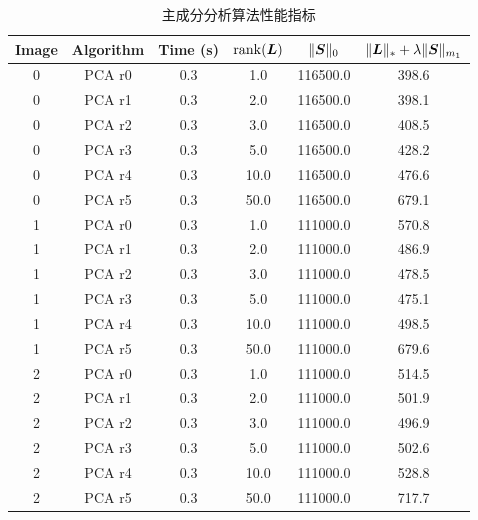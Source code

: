 \documentclass[12pt]{article}
\begin{document}
\begin{table}[!htbp]
  \centering
  \small
  \caption{主成分分析算法性能指标}
  \label{tab:pca_index}
  \begin{tabular}{cccccc}
    \toprule
    Image & Algorithm     & Time (s)  & $\operatorname{rank}(\bm{L})$ & $\|\bm{S}\|_0$  & $\|\bm{L}\|_{*}+\lambda\|\bm{S}\|_{m_1}$ \\
    \midrule
    0     & PCA r0    & 0.3      & 1.0         & 116500.0    & 398.6         \\
    0     & PCA r1    & 0.3      & 2.0         & 116500.0    & 398.1         \\
    0     & PCA r2    & 0.3      & 3.0         & 116500.0    & 408.5         \\
    0     & PCA r3    & 0.3      & 5.0         & 116500.0    & 428.2         \\
    0     & PCA r4    & 0.3      & 10.0        & 116500.0    & 476.6         \\
    0     & PCA r5    & 0.3      & 50.0        & 116500.0    & 679.1         \\
    1     & PCA r0    & 0.3      & 1.0         & 111000.0    & 570.8         \\
    1     & PCA r1    & 0.3      & 2.0         & 111000.0    & 486.9         \\
    1     & PCA r2    & 0.3      & 3.0         & 111000.0    & 478.5         \\
    1     & PCA r3    & 0.3      & 5.0         & 111000.0    & 475.1         \\
    1     & PCA r4    & 0.3      & 10.0        & 111000.0    & 498.5         \\
    1     & PCA r5    & 0.3      & 50.0        & 111000.0    & 679.6         \\
    2     & PCA r0    & 0.3      & 1.0         & 111000.0    & 514.5         \\
    2     & PCA r1    & 0.3      & 2.0         & 111000.0    & 501.9         \\
    2     & PCA r2    & 0.3      & 3.0         & 111000.0    & 496.9         \\
    2     & PCA r3    & 0.3      & 5.0         & 111000.0    & 502.6         \\
    2     & PCA r4    & 0.3      & 10.0        & 111000.0    & 528.8        \\
    2     & PCA r5    & 0.3      & 50.0        & 111000.0    & 717.7        \\
    \bottomrule
  \end{tabular}
\end{table}
\end{document}
